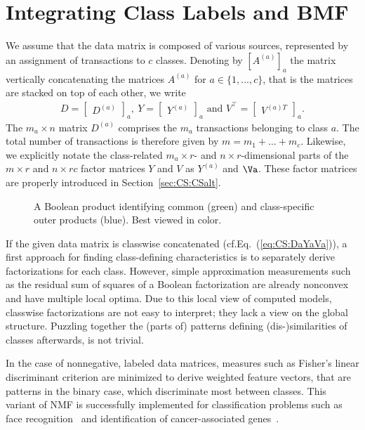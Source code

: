 \section{Integrating Class Labels and BMF}\label{sec:CS:IntegrateLabels}
We assume that the data matrix is composed of various sources, represented by an assignment of transactions to $c$ classes. Denoting by $[A^{(a)}]_a$ the matrix vertically concatenating the matrices $A^{(a)}$ for $a\in\{1,\ldots,c\}$, that is the matrices are stacked on top of each other, we write
\begin{align}\label{eq:CS:DaYaVa}
D=\begin{bmatrix}
D^{(a)}
\end{bmatrix}_a,\
Y=\begin{bmatrix}
Y^{(a)}
\end{bmatrix}_a \text{ and }
V^\top =\begin{bmatrix}
V^{(a)T}
\end{bmatrix}_a.
\end{align}
The $m_a\times n$ matrix $D^{(a)}$ comprises the $m_a$ transactions belonging to class $a$. The total number of transactions is therefore given by $m=m_1+\ldots+m_c$. Likewise, we explicitly notate the class-related $m_a\times r$- and $n\times r$-dimensional parts of the $m\times r$ and $n\times rc$ factor matrices $Y$ and $V$ as $Y^{(a)}$ and $\Va$. These factor matrices are properly introduced in Section~\ref{sec:CS:CSalt}.
\begin{figure}[!t]
\centering

\caption{A Boolean product identifying common (green) and class-specific outer products (blue). Best viewed in color.}
\label{fig:CS:usageJSMF}
\end{figure}
If the given data matrix is classwise concatenated (cf.\@ Eq.~(\ref{eq:CS:DaYaVa})), a first approach for finding class-defining characteristics is to separately derive factorizations for each class. However, simple approximation measurements such as the residual sum of squares of a Boolean factorization are already nonconvex and have multiple local optima.
Due to this local view of computed models, classwise factorizations are not easy to interpret; they lack a view on the global structure. Puzzling together the (parts of) patterns defining (dis-)similarities of classes afterwards, is not trivial.

In the case of nonnegative, labeled data matrices, measures such as Fisher's linear discriminant criterion are minimized to derive weighted feature vectors, that are patterns in the binary case, which discriminate most between classes. This variant of NMF is successfully implemented for classification problems such as face recognition~\citep{nikitidis2014projected} and identification of cancer-associated genes~\citep{odibat2014efficient}.

